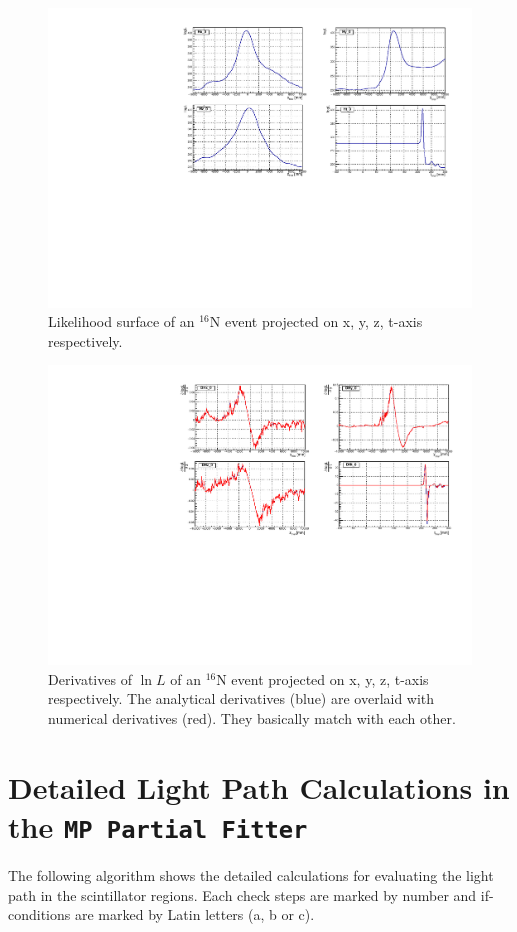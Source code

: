 \begin{figure}
	\centering
	\includegraphics[width=160mm]{logL_xyzt.pdf}
	\caption{Likelihood surface of an {$^{16}$}N event projected on x, y, z, t-axis respectively.}
	\label{logLxyz}
\end{figure}

\begin{figure}
	\centering
	\includegraphics[width=160mm]{derivativeLogL_xyzt.pdf}
	\caption{Derivatives of $\ln L$ of an {$^{16}$}N event projected on x, y, z, t-axis respectively. The analytical derivatives (blue) are overlaid with numerical derivatives (red). They basically match with each other.}
	\label{derivative_logLxyz}
\end{figure}

\section{Detailed Light Path Calculations in the \texttt{MP Partial Fitter}}\label{appendix:lightpath}
The following algorithm shows the detailed calculations for evaluating the light path in the scintillator regions. Each check steps are marked by number and if-conditions are marked by Latin letters (a, b or c). 

